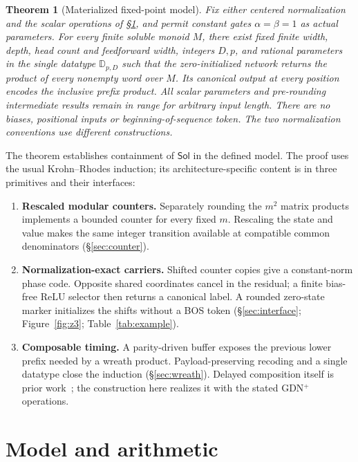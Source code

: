 \documentclass[10pt]{article}
\newtheorem{theorem}{Theorem}
\theoremstyle{remark}
\newcommand{\D}{\mathbb D}
\newcommand{\Sol}{\mathsf{Sol}}
\begin{document}
\begin{theorem}[Materialized fixed-point model]\label{thm:main}
Fix either centered normalization and the scalar operations of
\S\ref{sec:model}, and permit constant gates $\alpha=\beta=1$ as actual
parameters. For every finite soluble monoid $M$, there exist fixed finite
width, depth, head count and feedforward width, integers $D,p$, and rational
parameters in the single datatype $\D_{p,D}$ such that the zero-initialized
network returns the product of every nonempty word over $M$. Its canonical
output at every position encodes the inclusive prefix product. All scalar
parameters and pre-rounding intermediate results remain in range for arbitrary
input length. There are no biases, positional inputs or beginning-of-sequence
token. The two normalization conventions use different constructions.
\end{theorem}
The theorem establishes containment of $\Sol$ in the defined model. The proof
uses the usual Krohn--Rhodes induction; its architecture-specific content is in
three primitives and their interfaces:
\begin{enumerate}
\setlength{\itemsep}{2pt}
\item \textbf{Rescaled modular counters.} Separately rounding the $m^2$ matrix
products implements a bounded counter for every fixed $m$. Rescaling the state
and value makes the same integer transition available at compatible common
 denominators (\S\ref{sec:counter}).
\item \textbf{Normalization-exact carriers.} Shifted counter copies give a
constant-norm phase code. Opposite shared coordinates cancel in the residual;
a finite bias-free ReLU selector then returns a canonical label. A rounded
zero-state marker initializes the shifts without a BOS token
(\S\ref{sec:interface}; Figure~\ref{fig:z3}; Table~\ref{tab:example}).
\item \textbf{Composable timing.} A parity-driven buffer exposes the previous
lower prefix needed by a wreath product. Payload-preserving recoding and a
single datatype close the induction (\S\ref{sec:wreath}). Delayed composition
itself is prior work~\citep[Lemmas~18, 20]{sarrof}; the construction here realizes
it with the stated GDN$^+$ operations.
\end{enumerate}

\section{Model and arithmetic}\label{sec:model}
\end{document}
